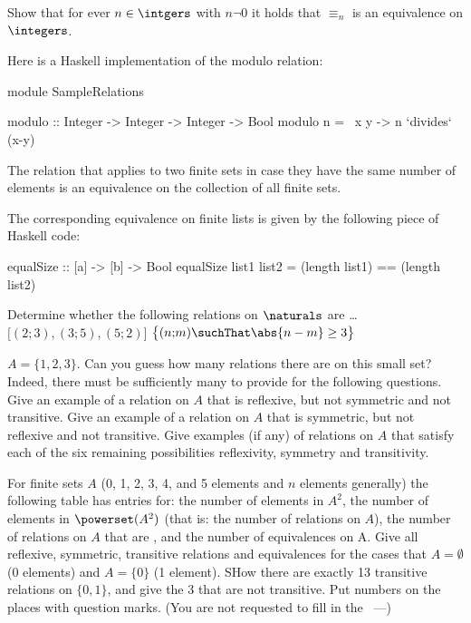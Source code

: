 \begin{Exercise} [number=66]
  Show that for ever $n \in \intgers$ with $n \neg 0$ it holds that
  $\equiv_n$ is an equivalence on $\integers$.
\end{Exercise}

Here is a Haskell implementation of the modulo relation:
\begin{code}

module SampleRelations

modulo :: Integer -> Integer -> Integer -> Bool
modulo n = \ x y -> n `divides` (x-y)
\end{code}

The relation that applies to two finite sets in case they have the
same number of elements is an equivalence on the collection of all
finite sets.

The corresponding equivalence on finite lists is given by the
following piece of Haskell code:
\begin{code}
equalSize :: [a] -> [b] -> Bool
equalSize list1 list2 = (length list1) == (length list2)
\end{code}

\begin{Exercise} [number=69]
  Determine whether the following relations on $\naturals$ are \dots %
  \Question $\lbrack (2;3), (3;5), (5;2) \rbrack$
  \Question $\bigl{\lbrace} (n;\!m) \suchThat \abs{n - m} \geq 3 \bigr{\rbrace}$
\end{Exercise}

\begin{Exercise} [number=70]
  $A = \{ 1, 2, 3 \}$. Can you guess how many relations there are on
  this small set? Indeed, there must be sufficiently many to provide
  for the following questions.
  \Question Give an example of a relation on $A$ that is reflexive,
  but not symmetric and not transitive.
  \Question Give an example of a relation on $A$ that is symmetric,
  but not reflexive and not transitive.
  \Question Give examples (if any) of relations on $A$ that satisfy
  each of the six remaining possibilities \wrt reflexivity, symmetry
  and transitivity.
\end{Exercise}

\begin{Exercise} [number=71]
  For finite sets $A$ (0, 1, 2, 3, 4, and 5 elements and $n$ elements
  generally) the following table has entries for: the number of
  elements in $A^2$, the number of elements in $\powerset(A^2)$ (that
  is: the number of relations on $A$), the number of relations on $A$
  that are %
  , and the number of equivalences on A.
  Give all reflexive, symmetric, transitive relations and equivalences
  for the cases that $A = \emptyset$ (0 elements) and $A = \{0\}$ (1
  element). SHow there are exactly 13 transitive relations on
  $\{0,1\}$, and give the 3 that are not transitive. Put numbers on
  the places with question marks. (You are not requested to fill in
  the ~---)
\end{Exercise}

